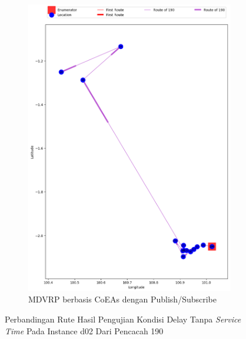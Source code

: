 \begin{figure}[H]\ContinuedFloat
	\centering
	\begin{subfigure}[t]{\textwidth}
		\centering
		\includegraphics[width=\textwidth]{Resources/Images/delayed_2/real_m15_n100_delayed_2_190_pubsub_coes}
		\caption{MDVRP berbasis CoEAs dengan Publish/Subscribe}
		\label{fig:real_m15_n100_delayed_2_190_pubsub_coes}
	\end{subfigure}
	\caption{Perbandingan Rute Hasil Pengujian Kondisi Delay Tanpa \textit{Service Time} Pada Instance d02 Dari Pencacah 190}
	\label{fig:real_m15_n100_delayed_2_190_contd}
\end{figure}


